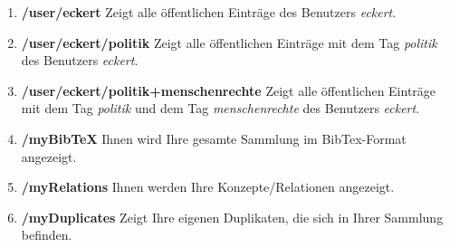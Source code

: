 \begin{enumerate}
    \item \textbf{/user/eckert} \newline
    Zeigt alle öffentlichen Einträge des Benutzers \textit{eckert}.
    \item \textbf{/user/eckert/politik} \newline
    Zeigt alle öffentlichen Einträge mit dem Tag \textit{politik} des Benutzers \textit{eckert}.
    \item \textbf{/user/eckert/politik+menschenrechte} \newline
    Zeigt alle öffentlichen Einträge mit dem Tag \textit{politik} und dem Tag \textit{menschenrechte} des Benutzers \textit{eckert}.
     \item \textbf{/myBibTeX} \newline
    Ihnen wird Ihre gesamte Sammlung im BibTex-Format angezeigt.
    \item \textbf{/myRelations} \newline
    Ihnen werden Ihre Konzepte/Relationen angezeigt.
    \item \textbf{/myDuplicates} \newline
    Zeigt Ihre eigenen Duplikaten, die sich in Ihrer Sammlung befinden.
\end{enumerate}    
